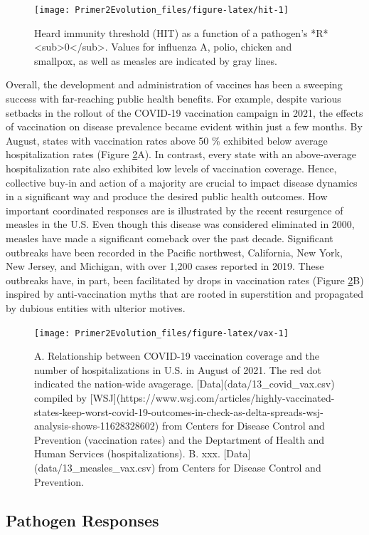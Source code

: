 \documentclass[
]{book}
\begin{document}
\begin{figure}
\texttt{[image: Primer2Evolution\_files/figure-latex/hit-1]} \caption{Heard immunity threshold (HIT) as a function of a pathogen's *R*<sub>0</sub>. Values for influenza A, polio, chicken and smallpox, as well as measles are indicated by gray lines.}\label{fig:hit}
\end{figure}

Overall, the development and administration of vaccines has been a sweeping success with far-reaching public health benefits. For example, despite various setbacks in the rollout of the COVID-19 vaccination campaign in 2021, the effects of vaccination on disease prevalence became evident within just a few months. By August, states with vaccination rates above 50 \% exhibited below average hospitalization rates (Figure \ref{fig:vax}A). In contrast, every state with an above-average hospitalization rate also exhibited low levels of vaccination coverage. Hence, collective buy-in and action of a majority are crucial to impact disease dynamics in a significant way and produce the desired public health outcomes. How important coordinated responses are is illustrated by the recent resurgence of measles in the U.S. Even though this disease was considered eliminated in 2000, measles have made a significant comeback over the past decade. Significant outbreaks have been recorded in the Pacific northwest, California, New York, New Jersey, and Michigan, with over 1,200 cases reported in 2019. These outbreaks have, in part, been facilitated by drops in vaccination rates (Figure \ref{fig:vax}B) inspired by anti-vaccination myths that are rooted in superstition and propagated by dubious entities with ulterior motives.

\begin{figure}
\texttt{[image: Primer2Evolution\_files/figure-latex/vax-1]} \caption{A. Relationship between COVID-19 vaccination coverage and the number of hospitalizations in U.S. in August of 2021. The red dot indicated the nation-wide avagerage. [Data](data/13_covid_vax.csv) compiled by [WSJ](https://www.wsj.com/articles/highly-vaccinated-states-keep-worst-covid-19-outcomes-in-check-as-delta-spreads-wsj-analysis-shows-11628328602) from Centers for Disease Control and Prevention (vaccination rates) and the Deptartment of Health and Human Services (hospitalizations). B. xxx. [Data](data/13_measles_vax.csv) from Centers for Disease Control and Prevention.}\label{fig:vax}
\end{figure}

\hypertarget{pathogen-responses}{%
\subsection{Pathogen Responses}\label{pathogen-responses}}
\end{document}
